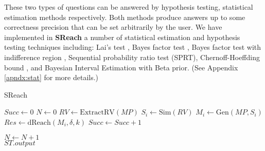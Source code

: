 These two types of questions can be answered by hypothesis testing, 
statistical estimation methods respectively. Both methods produce answers up to some correctness 
precision that can be set arbitrarily by the user.
We have implemented in {\bf SReach} a number of statistical estimation and hypothesis testing techniques including: {Lai's test} \cite{lai1988nearly}, {Bayes factor test} \cite{kass1995bayes}, {Bayes factor test with indifference region} \cite{younes2005verification}, {Sequential probability ratio test (SPRT)}\cite{wald1945sequential}, {Chernoff-Hoeffding bound} \cite{hoeffding1963probability}, and {Bayesian Interval Estimation with Beta prior}\cite{zuliani2010bayesian}. (See Appendix \ref{apndx:stat} for more details.) 
\vspace{-.5cm}
\begin{algorithm}
  \centering
  \caption{SReach}
  \label{fig:sreach}
  \begin{algorithmic}[1]
        \State $Succ \gets 0$	
        \State $N \gets 0$	
        \State $RV \gets \mathrm{ExtractRV}(MP)$	
        \Repeat
            \State $S_i \gets \mathrm{Sim}(RV)$		
            \State $M_i \gets \mathrm{Gen}(MP, S_i)$	
            \State $Res \gets \mathrm{dReach}(M_i, \delta, k)$	
		\State $Succ \gets Succ + 1$
	    
	  \EndIf
	\State $N \gets N + 1$
        	\\
	\quad\hspace{0.5ex} \Return $ST.output$
   \EndFunction
  \end{algorithmic}
\end{algorithm}
\vspace{-.3cm}
